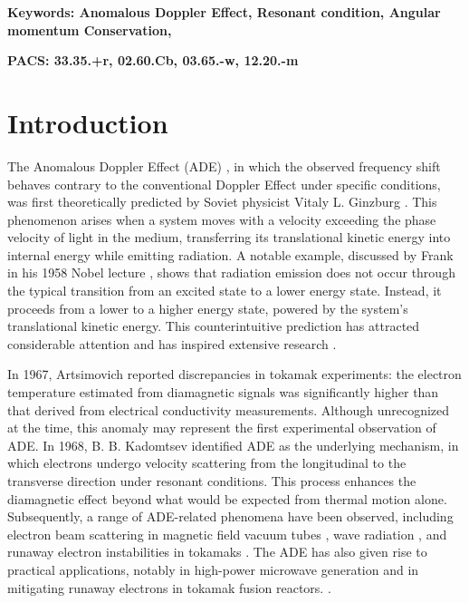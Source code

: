 \documentclass{cpbtex3}
\begin{document}
\textbf{Keywords: Anomalous Doppler Effect, Resonant condition, Angular momentum Conservation,  } %

\textbf{PACS: 33.35.+r, 02.60.Cb,  03.65.-w, 12.20.-m} %


\section{Introduction}
The Anomalous Doppler Effect (ADE) \cite{tamm1959general,frank1960optics,ginzburg1960certain,shustin1971transformation}, in which the observed frequency shift behaves contrary to the conventional Doppler Effect under specific conditions, was first theoretically predicted by Soviet physicist Vitaly L. Ginzburg \cite{ginzburg1946radiation}. This phenomenon arises when a system moves with a velocity exceeding the phase velocity of light in the medium, transferring its translational kinetic energy into internal energy while emitting radiation. A notable example, discussed by Frank in his 1958 Nobel lecture \cite{frank1960optics}, shows that radiation emission does not occur through the typical transition from an excited state to a lower energy state. Instead, it proceeds from a lower to a higher energy state, powered by the system's translational kinetic energy. This counterintuitive prediction has attracted considerable attention and has inspired extensive research \cite{nezlin1976negative,santini1984anomalous,kho1988slow,wang2016multi,guo2018control,liu2018role,shi2018superlight,filatov2021role}.

In 1967, Artsimovich \cite{artsimovich1967thermal} reported discrepancies in tokamak experiments: the electron temperature estimated from diamagnetic signals was significantly higher than that derived from electrical conductivity measurements. Although unrecognized at the time, this anomaly may represent the first experimental observation of ADE. In 1968, B. B. Kadomtsev \cite{kadomtsev1968electric} identified ADE as the underlying mechanism, in which electrons undergo velocity scattering from the longitudinal to the transverse direction under resonant conditions. This process enhances the diamagnetic effect beyond what would be expected from thermal motion alone. Subsequently, a range of ADE-related phenomena have been observed, including electron beam scattering in magnetic field vacuum tubes \cite{frank1960optics}, wave radiation \cite{spong2018first,liu2019intense,gorozhanin1997waves}, and runaway electron instabilities in tokamaks \cite{sajjad2007runaway,castejon2003particle}. The ADE has also given rise to practical applications, notably in high-power microwave generation and in mitigating runaway electrons in tokamak fusion reactors. \cite{guo2018control,zhang2024self}.
\end{document}
